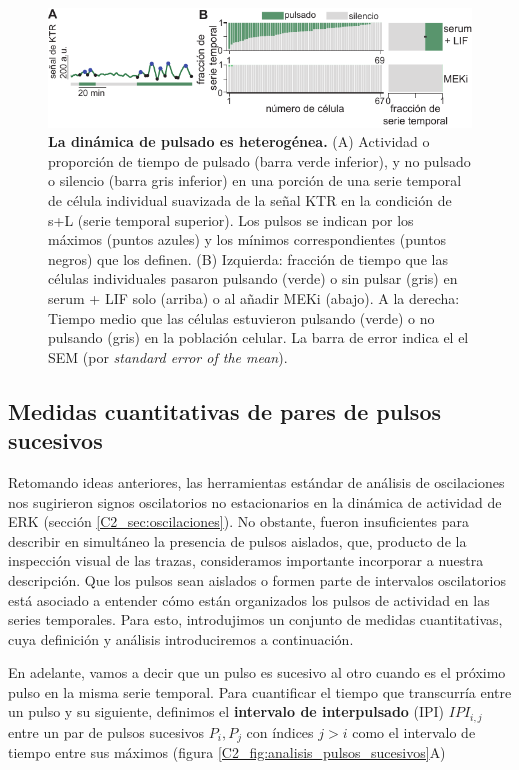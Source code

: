 \documentclass[./main.tex]{subfiles}
\begin{document}
 \begin{figure}
    \centering
    \includegraphics[width=1\textwidth]{figures/chapter2/C2_activity.pdf} 
    \caption{\textbf{La dinámica de pulsado es heterogénea.} (A) Actividad o proporción de tiempo de pulsado (barra verde inferior), y no pulsado o silencio (barra gris inferior) en una porción de una serie temporal de célula individual suavizada de la señal KTR en la condición de s+L (serie temporal superior). Los pulsos se indican por los máximos (puntos azules) y los mínimos correspondientes (puntos negros) que los definen. (B) Izquierda: fracción de tiempo que las células individuales pasaron pulsando (verde) o sin pulsar (gris) en serum + LIF solo (arriba) o al añadir MEKi (abajo). A la derecha: Tiempo medio que las células estuvieron pulsando (verde) o no pulsando (gris) en la población celular. La barra de error indica el el SEM (por \textit{standard error of the mean}).}
    \label{C2_fig:actividad}
\end{figure}


 \subsection{Medidas cuantitativas de pares de pulsos sucesivos}

Retomando ideas anteriores, las herramientas estándar de análisis de oscilaciones nos sugirieron signos oscilatorios no estacionarios en la dinámica de actividad de ERK (sección \ref{C2_sec:oscilaciones}). No obstante, fueron insuficientes para describir en simultáneo la presencia de pulsos aislados, que, producto de la inspección visual de las trazas, consideramos importante incorporar a nuestra descripción. Que los pulsos sean aislados o formen parte de intervalos oscilatorios está asociado a entender cómo están organizados los pulsos de actividad en las series temporales. Para esto, introdujimos un conjunto de medidas cuantitativas, cuya definición y análisis introduciremos a continuación.


En adelante, vamos a decir que  un pulso es sucesivo al otro cuando es el próximo pulso en la misma serie temporal. Para cuantificar el tiempo que transcurría entre un pulso y su siguiente, definimos el \textbf{intervalo de interpulsado} (IPI) $IPI_{i,j}$ entre un par de pulsos sucesivos $P_i, P_j$ con índices $j >i$ como el intervalo de tiempo entre sus máximos (figura \ref{C2_fig:analisis_pulsos_sucesivos}A)  
\end{document}
